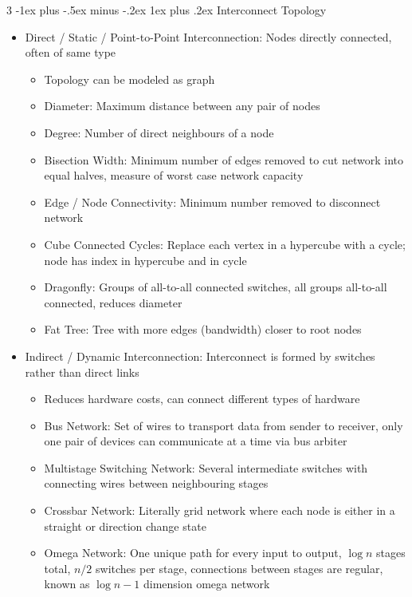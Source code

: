 \documentclass[10pt, landscape]{article}
\makeatletter
\renewcommand{\subsection}{\@startsection{subsection}{3}{0mm}%
                                {-1ex plus -.5ex minus -.2ex}%
                                {1ex plus .2ex}%
                                {\normalfont\small\bfseries}}%
\makeatother
\begin{document}
\begin{multicols*}{3}
\subsection{Interconnect Topology}
\begin{itemize}
    \item Direct / Static / Point-to-Point Interconnection: Nodes directly connected, often of same type
    \begin{itemize}
        \item Topology can be modeled as graph
        \item Diameter: Maximum distance between any pair of nodes
        \item Degree: Number of direct neighbours of a node
        \item Bisection Width: Minimum number of edges removed to cut network into equal halves, measure of worst case network capacity
        \item Edge / Node Connectivity: Minimum number removed to disconnect network
        \item Cube Connected Cycles: Replace each vertex in a hypercube with a cycle; node has index in hypercube and in cycle
        \item Dragonfly: Groups of all-to-all connected switches, all groups all-to-all connected, reduces diameter
        \item Fat Tree: Tree with more edges (bandwidth) closer to root nodes
    \end{itemize}
    \item Indirect / Dynamic Interconnection: Interconnect is formed by switches rather than direct links
    \begin{itemize}
        \item Reduces hardware costs, can connect  different types of hardware
        \item Bus Network: Set of wires to transport data from sender to receiver, only one pair of devices can communicate at a time via bus arbiter
        \item Multistage Switching Network: Several intermediate switches with connecting wires between neighbouring stages
        \item Crossbar Network: Literally grid network where each node is either in a straight or direction change state
        \item Omega Network: One unique path for every input to output, $\log n$ stages total, $n/2$ switches per stage, connections between stages are regular, known as $\log n - 1$ dimension omega network

\end{itemize}
\end{itemize}
\end{multicols*}
\end{document}
